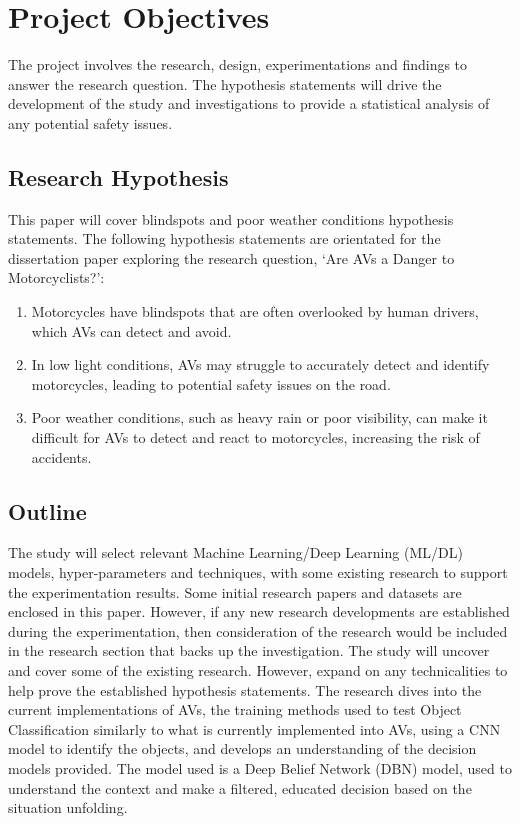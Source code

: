 \documentclass[12pt]{report} %
\begin{document}
\chapter{Project Objectives}
	The project involves the research, design, experimentations and findings to answer the research question. The hypothesis statements will drive the development of the study and investigations to provide a statistical analysis of any potential safety issues.

	\section{Research Hypothesis}
		This paper will cover blindspots and poor weather conditions hypothesis statements. The following hypothesis statements are orientated for the dissertation paper exploring the research question, `Are AVs a Danger to Motorcyclists?':

		\begin{enumerate}
			\item Motorcycles have blindspots that are often overlooked by human drivers, which AVs can detect and avoid.
			\item In low light conditions, AVs may struggle to accurately detect and identify motorcycles, leading to potential safety issues on the road.
			\item Poor weather conditions, such as heavy rain or poor visibility, can make it difficult for AVs to detect and react to motorcycles, increasing the risk of accidents.
		\end{enumerate}

	\section{Outline}
		The study will select relevant Machine Learning/Deep Learning (ML/DL) models, hyper-parameters and techniques, with some existing research to support the experimentation results. Some initial research papers and datasets are enclosed in this paper. However, if any new research developments are established during the experimentation, then consideration of the research would be included in the research section that backs up the investigation. The study will uncover and cover some of the existing research. However, expand on any technicalities to help prove the established hypothesis statements. The research dives into the current implementations of AVs, the training methods used to test Object Classification similarly to what is currently implemented into AVs, using a CNN model to identify the objects, and develops an understanding of the decision models provided. The model used is a Deep Belief Network (DBN) model, used to understand the context and make a filtered, educated decision based on the situation unfolding.
\end{document}
